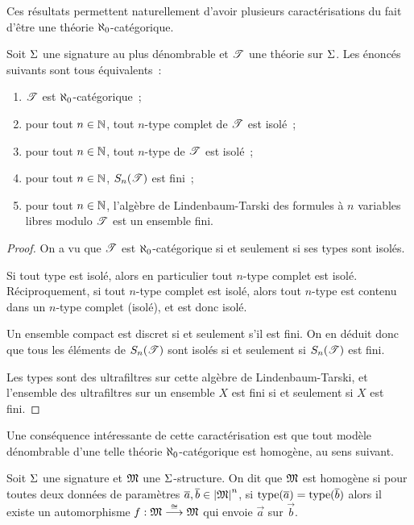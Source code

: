 Ces résultats permettent naturellement d'avoir plusieurs caractérisations du
fait d'être une théorie $\aleph_0$-catégorique.

\begin{theorem}
  Soit $\Sigma$ une signature au plus dénombrable et $\mathscr T$ une théorie sur
  $\Sigma$. Les énoncés suivants sont tous équivalents~:
  \begin{enumerate}[label=(\roman*)]
  \item $\mathscr T$ est $\aleph_0$-catégorique~;
  \item pour tout $n \in \mathbb N$, tout $n$-type complet de $\mathscr T$ est isolé~;
  \item pour tout $n \in \mathbb N$, tout $n$-type de $\mathscr T$ est isolé~;
  \item pour tout $n \in \mathbb N$, $S_{n}(\mathscr T)$ est fini~;
  \item pour tout $n \in \mathbb N$, l'algèbre de Lindenbaum-Tarski des formules à
    $n$ variables libres modulo $\mathscr T$ est un ensemble fini.
  \end{enumerate}
\end{theorem}

\begin{proof}
  On a vu que $\mathscr T$ est $\aleph_0$-catégorique si et seulement si ses types
  sont isolés.

  Si tout type est isolé, alors en particulier tout $n$-type complet est isolé.
  Réciproquement, si tout $n$-type complet est isolé, alors tout $n$-type est
  contenu dans un $n$-type complet (isolé), et est donc isolé.

  Un ensemble compact est discret si et seulement s'il est fini. On en déduit
  donc que tous les éléments de $S_{n}(\mathscr T)$ sont isolés si et seulement si
  $S_{n}(\mathscr T)$ est fini.

  Les types sont des ultrafiltres sur cette algèbre de Lindenbaum-Tarski, et
  l'ensemble des ultrafiltres sur un ensemble $X$ est fini si et seulement si
  $X$ est fini.
\end{proof}

Une conséquence intéressante de cette caractérisation est que tout modèle
dénombrable d'une telle théorie $\aleph_0$-catégorique est homogène, au sens
suivant.

\begin{definition}
  Soit $\Sigma$ une signature et $\mathfrak{M}$ une $\Sigma$-structure. On dit que
  $\mathfrak{M}$ est homogène si pour toutes deux données de paramètres
  $\overline{a},\overline{b}\in\left\vert \mathfrak{M}\right\vert^n$, si $\operatorname{type}(\overline{a}) = \operatorname{type}(\overline{b})$
  alors il existe un automorphisme
  $f : \displaystyle \mathfrak{M} \overset{\cong}{\longrightarrow} \mathfrak{M}$ qui envoie $\vec a$ sur
  $\vec b$.
\end{definition}

